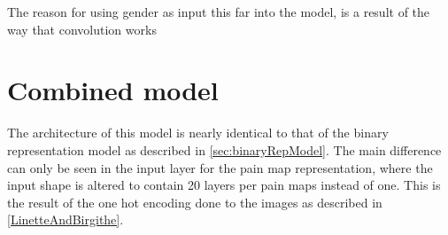 The reason for using gender as input this far into the model, is a result of the way that convolution works 



\section{Combined model}
The architecture of this model is nearly identical to that of the binary representation model as described in \ref{sec:binaryRepModel}. 
The main difference can only be seen in the input layer for the pain map representation, where the input shape is altered to contain 20 layers per pain maps instead of one. 
This is the result of the one hot encoding done to the images as described in \autoref{LinetteAndBirgithe}. 

